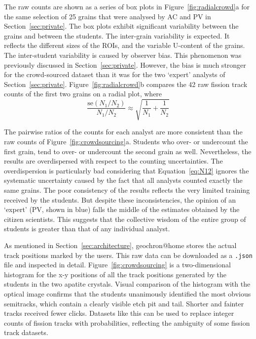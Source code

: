 \documentclass[gchron, manuscript]{copernicus}
\begin{document}
The raw counts are shown as a series of box plots in
Figure~\ref{fig:radialcrowd}a for the same selection of 25 grains that
were analysed by AC and PV in Section~\ref{sec:private}. The box plots
exhibit significant variability between the grains and between the
students. The inter-grain variability is expected. It reflects the
different sizes of the ROIs, and the variable U-content of the
grains. The inter-student variability is caused by observer bias. This
phenomenon was previously discussed in
Section~\ref{sec:private}. However, the bias is much stronger for the
crowd-sourced dataset than it was for the two `expert' analysts of
Section~\ref{sec:private}. Figure~\ref{fig:radialcrowd}b compares the
42 raw fission track counts of the first two grains on a radial plot,
where
\begin{equation}
  \frac{\mbox{se}(N_1/N_2)}{N_1/N_2}
  \approx
  \sqrt{
    \frac{1}{N_1} + \frac{1}{N_2}
  }
  \label{eq:N12}
\end{equation}

The pairwise ratios of the counts for each analyst are more consistent
than the raw counts of Figure~\ref{fig:crowdsourcing}a.  Students who
over- or undercount the first grain, tend to over- or undercount the
second grain as well. Nevertheless, the results are overdispersed with
respect to the counting uncertainties. The overdispersion is
particularly bad considering that Equation~\ref{eq:N12} ignores the
systematic uncertainty caused by the fact that all analysts counted
exactly the same grains.  The poor consistency of the results reflects
the very limited training received by the students. But despite these
inconsistencies, the opinion of an `expert' (PV, shown in blue) falls
the middle of the estimates obtained by the citizen scientists. This
suggests that the collective wisdom of the entire group of students is
greater than that of any individual analyst.\medskip

As mentioned in Section~\ref{sec:architecture}, geochron@home stores
the actual track positions marked by the users. This raw data can be
downloaded as a \texttt{.json} file and inspected in detail.
Figure~\ref{fig:crowdsourcing} is a two-dimensional histogram for the
x-y positions of all the track positions generated by the students in
the two apatite crystals. Visual comparison of the histogram with the
optical image confirms that the students unanimously identified the
most obvious semitracks, which contain a clearly visible etch pit and
tail. Shorter and fainter tracks received fewer clicks. Datasets like
this can be used to replace integer counts of fission tracks with
probabilities, reflecting the ambiguity of some fission track
datasets.\medskip
\end{document}
